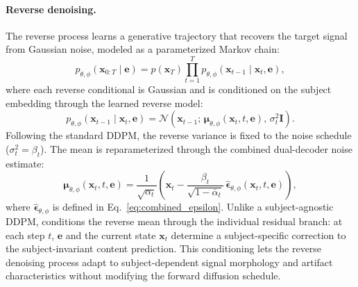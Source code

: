 \paragraph{Reverse denoising.}
The reverse process learns a generative trajectory that recovers the target signal
from Gaussian noise, modeled as a parameterized Markov chain:
\begin{equation}
  p_{\theta,\phi}(\mathbf{x}_{0:T}\mid\mathbf{e})
  =p(\mathbf{x}_T)\prod_{t=1}^{T}
  p_{\theta,\phi}(\mathbf{x}_{t-1}\mid \mathbf{x}_t,\mathbf{e}),
  \label{eq:reverse_chain}
\end{equation}
where each reverse conditional is Gaussian and is conditioned on the subject
embedding through the learned reverse model:
\begin{equation}
  p_{\theta,\phi}(\mathbf{x}_{t-1}\mid \mathbf{x}_t,\mathbf{e})
  =\mathcal{N}\!\left(
  \mathbf{x}_{t-1};\,
  \boldsymbol{\mu}_{\theta,\phi}(\mathbf{x}_t,t,\mathbf{e}),\,
  \sigma_t^2\mathbf{I}
  \right).
  \label{eq:reverse_step}
\end{equation}
Following the standard DDPM, the reverse variance is fixed to the noise schedule
($\sigma_t^2=\beta_t$). The mean is reparameterized through the combined
dual-decoder noise estimate:
\begin{equation}
  \boldsymbol{\mu}_{\theta,\phi}(\mathbf{x}_t,t,\mathbf{e})
  =\frac{1}{\sqrt{\alpha_t}}\!\left(
  \mathbf{x}_t-
  \frac{\beta_t}{\sqrt{1-\bar{\alpha}_t}}\,
  \widehat{\boldsymbol{\epsilon}}_{\theta,\phi}(\mathbf{x}_t,t,\mathbf{e})
  \right),
  \label{eq:reverse_mean_combined}
\end{equation}
where $\widehat{\boldsymbol{\epsilon}}_{\theta,\phi}$ is defined in
Eq.~\eqref{eq:combined_epsilon}. Unlike a subject-agnostic DDPM, \saddpm{}
conditions the reverse mean through the individual residual branch: at each step
$t$, $\mathbf{e}$ and the current state $\mathbf{x}_t$ determine a
subject-specific correction to the subject-invariant content prediction. This
conditioning lets the reverse denoising process adapt to subject-dependent signal
morphology and artifact characteristics without modifying the forward diffusion
schedule.

